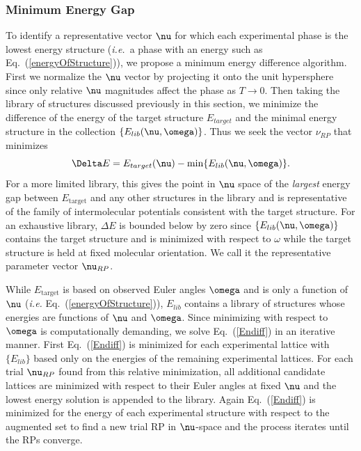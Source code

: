 \documentclass[preprint]{iucr}              %
\newcommand{\mb}[1]{\ensuremath{\mbox{\boldmath $ #1 $}}}
\begin{document}
\subsubsection{Minimum Energy Gap}
\label{Minimum_Energy_Gap}

To identify a representative vector $\mb{\nu}$ for which each
experimental phase is the lowest energy structure (\emph{i.e.}\ a
phase with an energy such as Eq.\ (\ref{energyOfStructure})), we
propose a minimum energy difference algorithm. First we normalize the
$\mb{\nu}$ vector by projecting it onto the unit hypersphere since only relative
$\mb{\nu}$ magnitudes affect the phase as $T\rightarrow 0$. Then
taking the library of structures discussed previously in this
section, we minimize the difference of the energy of the target
structure $E_{target}$ and the minimal energy structure in the
collection $\{E_{lib}(\mb{\nu},\mb{\omega})\}$.  Thus we seek the
vector $\nu_{RP}$ that minimizes
\begin{equation}
\label{Endiff} \Delta E =
E_{target}(\mb{\nu})-\min\{E_{lib}(\mb{\nu},\mb{\omega})\}.
\end{equation}
For a more limited library, this gives the point in $\mb{\nu}$ space of the \emph{largest}
energy gap between $E_{\mathrm{target}}$ and any other structures in
the library and is representative of the family of intermolecular
potentials consistent with the target structure. For an exhaustive
library, $\Delta E$ is bounded below by zero since
$\{E_{lib}(\mb{\nu},\mb{\omega})\}$ contains the target structure
and is minimized with respect to $\omega$ while the target structure
is held at fixed molecular orientation. We call it the
representative parameter vector $\mb{\nu}_{RP}$.

While $E_{\mathrm{target}}$ is based on observed Euler angles
$\mb{\omega}$ and is only a function of $\mb{\nu}$ (\emph{i.e.} Eq.\
(\ref{energyOfStructure})), $E_{lib}$ contains a library of structures
whose energies are functions of $\mb{\nu}$ and $\mb{\omega}$. Since
minimizing with respect to $\mb{\omega}$ is computationally
demanding, we solve Eq.~(\ref{Endiff}) in an iterative manner. First
Eq.~(\ref{Endiff}) is minimized for each experimental lattice with
$\{E_{lib}\}$ based only on the energies of the remaining
experimental lattices. For each trial $\mb{\nu}_{RP}$ found from
this relative minimization, all additional candidate lattices are
minimized with respect to their Euler angles at fixed $\mb{\nu}$ and
the lowest energy solution is appended to the library. Again
Eq.~(\ref{Endiff}) is minimized for the energy of each experimental
structure with respect to the augmented set to find a new trial RP
in $\mb{\nu}$-space and the process iterates until the RPs
converge.
\end{document}
